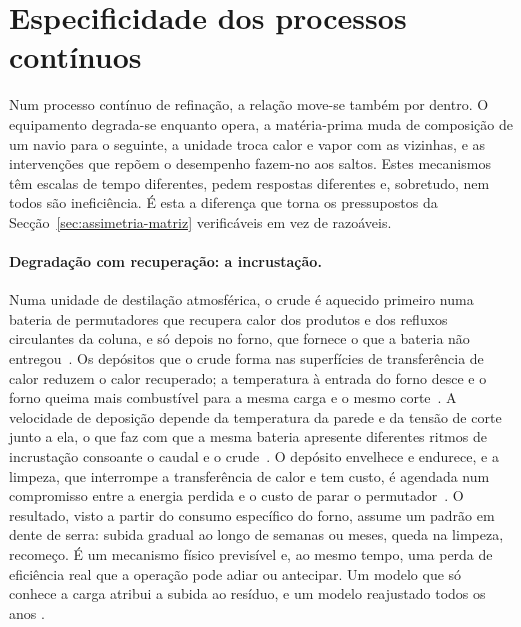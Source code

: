 \section{Especificidade dos processos contínuos}
\label{sec:processos-continuos}

 Num processo contínuo de refinação, a relação move-se
também por dentro. O equipamento degrada-se enquanto opera, a matéria-prima
muda de composição de um navio para o seguinte, a unidade troca calor e
vapor com as vizinhas, e as intervenções que repõem o desempenho fazem-no aos
saltos. Estes mecanismos têm escalas de tempo diferentes, pedem respostas
diferentes e, sobretudo, nem todos são ineficiência. É esta a diferença que
torna os pressupostos da Secção~\ref{sec:assimetria-matriz} verificáveis em
vez de razoáveis.

\paragraph{Degradação com recuperação: a incrustação.} Numa unidade de
destilação atmosférica, o crude é aquecido primeiro numa bateria de
permutadores que recupera calor dos produtos e dos refluxos circulantes da
coluna, e só depois no forno, que fornece o que a bateria não entregou~\cite{Gary2007}.
Os depósitos que o crude forma nas superfícies de transferência de calor reduzem o calor
recuperado; a temperatura à entrada do forno desce e o forno queima mais
combustível para a mesma carga e o mesmo corte~\cite{ColettiMacchietto2011}.
A velocidade de deposição depende da temperatura da parede e da tensão de
corte junto a ela, o que faz com que a mesma bateria apresente diferentes ritmos de incrustação consoante o caudal e o crude~\cite{Wilson2017}. O depósito envelhece e
endurece, e a limpeza, que interrompe a transferência de calor e tem custo, é agendada num
compromisso entre a energia perdida e o custo de parar o
permutador~\cite{Ishiyama2011}. O resultado, visto a partir do consumo
específico do forno, assume um padrão em dente de serra: subida gradual ao longo de semanas
ou meses, queda na limpeza, recomeço. É um mecanismo físico previsível e, ao
mesmo tempo, uma perda de eficiência real que a operação pode adiar ou
antecipar. Um modelo que só conhece a carga atribui a subida ao resíduo, e um
modelo reajustado todos os anos .

